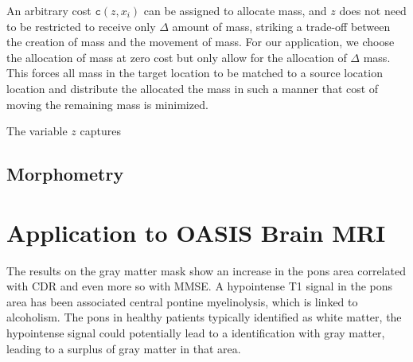\documentclass{llncs}
\newcommand{\cost}[0]{\mathtt{c}}
\begin{document}
An arbitrary cost $\cost(z, x_i)$ can be assigned to allocate mass, and $z$
does not need to be restricted to receive only $\Delta$ amount of mass,
striking a trade-off between the creation of mass and the movement of mass. For
our application, we choose the allocation of mass at zero cost but only allow
for the allocation of $\Delta$ mass. This forces all mass in the target
location to be matched to a source location location and distribute the
allocated the mass in such a manner that cost of moving the remaining mass is
minimized.

The variable $z$ captures


\subsection{Morphometry}




\section{Application to OASIS Brain MRI}

The results on the gray matter mask show an increase in the pons area
correlated with CDR and even more so with MMSE.  A hypointense T1 signal in the
pons area has been associated central pontine myelinolysis, which is linked to
alcoholism. The pons in healthy patients typically identified as white matter,
the hypointense signal could potentially lead to a identification with gray
matter, leading to a surplus of gray matter in that area.
\end{document}
